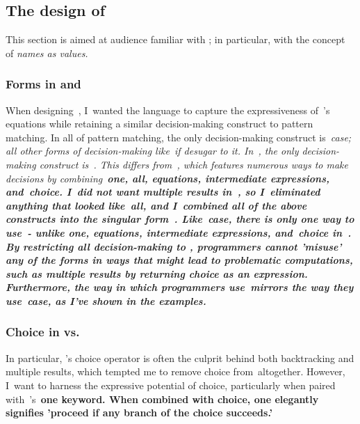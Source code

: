 \documentclass[manuscript,screen 12pt, nonacm]{acmart}
\begin{document}
    \subsection{The design of~\VMinus}

    This section is aimed at audience familiar with \VC; in particular, with the
    concept of \it{names as values}.
    
    \subsubsection{Forms in \VC and \VMinus}
    
    When designing~\VMinus, I~wanted the language to capture the expressiveness
    of~\VC's equations while retaining a similar decision-making construct to
    pattern matching. In all of pattern matching, the only decision-making
    construct is~\it{case}; all other forms of decision-making like~\it{if}
    desugar to it. In~\VMinus, the only decision-making construct is~\iffibf.
    This differs from~\VC, which features numerous ways to make decisions by
    combining~\bf{one}, \bf{all}, equations, intermediate expressions,
    and~choice. I~did not want multiple results in~\VMinus, so I~eliminated
    anything that looked like~\bf{all}, and I~combined all of the above
    constructs into the singular form~\iffibf. Like~\it{case}, there is only one
    way to use~\iffibf- unlike \bf{one}, equations, intermediate expressions,
    and~choice in~\VC. By restricting all decision-making to \iffibf,
    programmers cannot 'misuse' any of the forms in ways that might lead to
    problematic computations, such as multiple results by returning choice as an
    expression. Furthermore, the way in which programmers use~\iffibf mirrors
    the way they use~\it{case}, as I've shown in the examples. 
    
    \subsubsection{Choice in \VMinus vs. \VC}

    In particular, \VC's choice operator is often the culprit behind both
    backtracking and multiple results, which tempted me to remove choice
    from~\VMinus altogether. However, I~want to harness the expressive potential
    of choice, particularly when paired with~\VC's~\bf{one} keyword. When
    combined with choice, \bf{one} elegantly signifies 'proceed if any branch of
    the choice succeeds.' 
    
\end{document}
